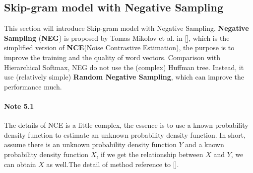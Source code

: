 \subsection{Skip-gram model with Negative Sampling}
This section will introduce Skip-gram model with Negative Sampling. \textbf{Negative Sampling} (\textbf{NEG}) is proposed by Tomas Mikolov et al. in [], which is the simplified version of \textbf{NCE}(Noise Contrastive Estimation), the purpose is to improve the training and the quality of word vectors. Comparison with Hierarchical Softmax, NEG do not use the (complex) Huffman tree. Instead, it use (relatively simple) \textbf{Random Negative Sampling}, which can improve the performance much.
\paragraph{Note 5.1} The details of NCE is a little complex, the essence is to use a known probability density function to estimate an unknown probability density function. In short, assume there is an unknown probability density function $Y$ and a known probability density function $X$, if we get the relationship between $X$ and $Y$, we can obtain $X$ as well.The detail of method reference to []. 

